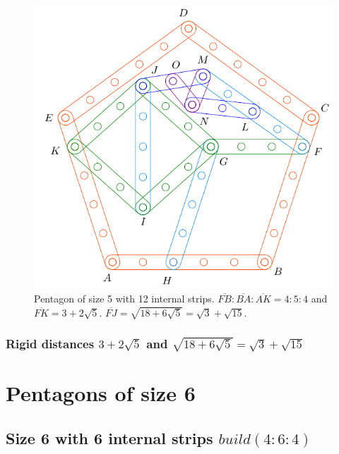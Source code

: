 \documentclass[11pt]{article}
\begin{document}
\begin{figure}[H]
\centering
\includegraphics[scale=0.9]{5/penta5-12a}
\caption{Pentagon of size 5 with 12 internal strips. $\overline{FB} : \overline{BA} : \overline{AK} = 4:5:4$ and $\overline{FK} = 3 + 2\sqrt5$. $\overline{FJ} = \sqrt{18+6\sqrt5} = \sqrt3 + \sqrt{15}$.}
\label{fig:penta5-12a}
\end{figure}

\subsubsection{Rigid distances $3+2\sqrt5$ and $\sqrt{18+6\sqrt5} = \sqrt3 + \sqrt{15}$}



\section{Pentagons of size 6}

\subsection{Size 6 with 6 internal strips $build(4:6:4)$}
\end{document}
